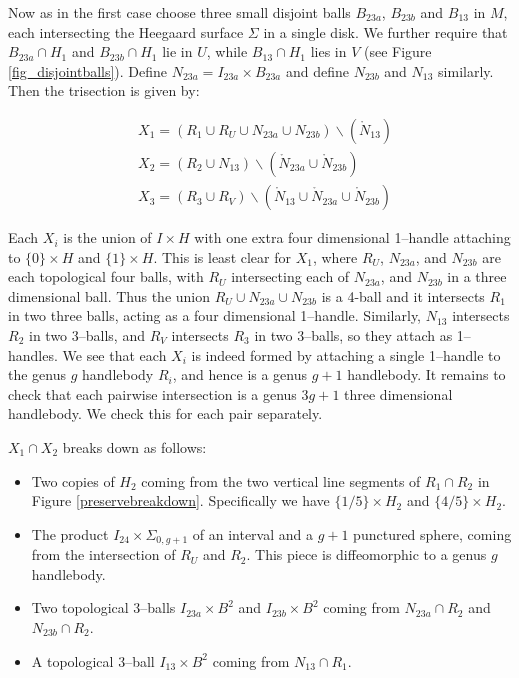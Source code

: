 \documentclass[12pt]{amsart}
\theoremstyle{definition}
\theoremstyle{remark}
\begin{document}
Now as in the first case choose three small disjoint balls $B_{23a}$, $B_{23b}$ and $B_{13}$ in $M$, each intersecting the Heegaard surface $\Sigma$ in a single disk.
We further require that $B_{23a} \cap H_1$ and $B_{23b} \cap H_1$ lie in $U$, while $B_{13} \cap H_1$ lies in $V$ (see Figure \ref{fig_disjointballs}).
Define $N_{23a} = I_{23a} \times B_{23a}$ and define $N_{23b}$ and $N_{13}$ similarly.
Then the trisection is given by:

\begin{align*}
&X_1 = (R_1 \cup R_U \cup N_{23a} \cup N_{23b}) \backslash (\mathring N_{13}) \\
&X_2 = (R_2 \cup N_{13}) \backslash (\mathring N_{23a} \cup \mathring N_{23b}) \\
&X_3 = (R_3 \cup R_V) \backslash (\mathring N_{13} \cup \mathring N_{23a} \cup \mathring N_{23b})
\end{align*}

Each $X_i$ is the union of $I \times H$ with one extra four dimensional 1--handle attaching to $\{0\} \times H$ and $\{1\} \times H$.
This is least clear for $X_1$, where $R_U$, $N_{23a}$, and $N_{23b}$ are each topological four balls, with $R_U$ intersecting each of $N_{23a}$, and $N_{23b}$ in a three dimensional ball.
Thus the union $R_U \cup N_{23a} \cup N_{23b}$ is a 4-ball and it intersects $R_1$ in two three balls, acting as a four dimensional 1--handle.
Similarly, $N_{13}$ intersects $R_2$ in two 3--balls, and $R_V$ intersects $R_3$ in two 3--balls, so they attach as 1--handles.
 We see that each $X_i$ is indeed formed by attaching a single 1--handle to the genus $g$ handlebody $R_i$, and hence is a genus $g+1$ handlebody.
It remains to check that each pairwise intersection is a genus $3g+1$ three dimensional handlebody.
We check this for each pair separately.

$X_1 \cap X_2$ breaks down as follows:

\begin{itemize}
\item Two copies of $H_2$ coming from the two vertical line segments of $R_1 \cap R_2$ in Figure \ref{preservebreakdown}.
Specifically we have $\{1/5\} \times H_2$ and $\{4/5\} \times H_2$.
\item The product $I_{24} \times \Sigma_{0,g+1}$ of an interval and a $g+1$ punctured sphere, coming from the intersection of $R_U$ and $R_2$.
This piece is diffeomorphic to a genus $g$ handlebody.
\item Two topological 3--balls $I_{23a} \times B^2$ and $I_{23b} \times B^2$ coming from $N_{23a} \cap R_2$ and $N_{23b} \cap R_2$.
\item A topological 3--ball $I_{13} \times B^2$ coming from $N_{13} \cap R_1$.
\end{itemize}
\end{document}
